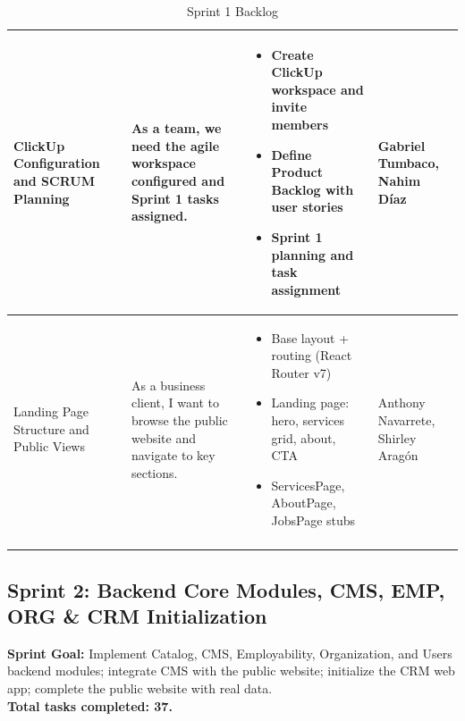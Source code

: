 \documentclass[letterpaper%
, oneside%
, 12pt%
, memoireprojet%
, english%
,creativecommons,hyperref, withAlgo2e %
]{thETS}
\begin{document}
\begin{longtable}{|p{3.0cm}|p{4.6cm}|p{5.6cm}|p{3.0cm}|}
ClickUp Configuration and SCRUM Planning & As a team, we need the agile workspace configured and Sprint 1 tasks assigned. & \begin{itemize}\setlength{\itemsep}{2pt}
    \item Create ClickUp workspace and invite members
    \item Define Product Backlog with user stories
    \item Sprint 1 planning and task assignment
\end{itemize} & Gabriel Tumbaco, Nahim Díaz \\ \hline

Landing Page Structure and Public Views & As a business client, I want to browse the public website and navigate to key sections. & \begin{itemize}\setlength{\itemsep}{2pt}
    \item Base layout + routing (React Router v7)
    \item Landing page: hero, services grid, about, CTA
    \item ServicesPage, AboutPage, JobsPage stubs
\end{itemize} & Anthony Navarrete, Shirley Aragón \\ \hline
\caption{Sprint 1 Backlog}
\label{tab:sprint1_backlog}
\end{longtable}
\endgroup

\subsection{Sprint 2: Backend Core Modules, CMS, EMP, ORG \& CRM Initialization}
\textbf{Sprint Goal:} Implement Catalog, CMS, Employability, Organization, and Users backend modules; integrate CMS with the public website; initialize the CRM web app; complete the public website with real data. \\
\textbf{Total tasks completed: 37.}
\end{document}

